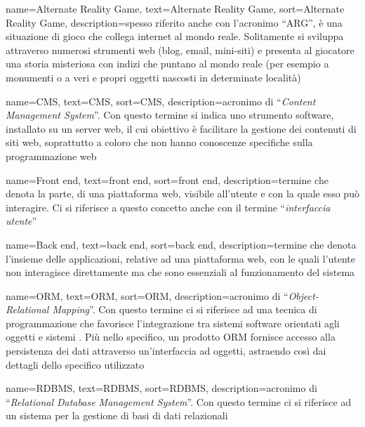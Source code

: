 {
    name=Alternate Reality Game, %
    text=Alternate Reality Game, %
    sort=Alternate Reality Game,
    description={spesso riferito anche con l’acronimo “ARG”, è una situazione di gioco che collega internet al mondo reale. Solitamente si sviluppa attraverso numerosi strumenti web (blog, email, mini-siti) e presenta al giocatore una storia misteriosa con indizi che puntano al mondo reale (per esempio a monumenti o a veri e propri oggetti nascosti in determinate località)}
}

{
    name=CMS, %
    text=CMS, %
    sort=CMS,
    description={acronimo di “\emph{Content Management System}”. Con questo termine si indica uno strumento software, installato su un server web, il cui obiettivo è facilitare la gestione dei contenuti di siti web, soprattutto a coloro che non hanno conoscenze specifiche sulla programmazione web}
}

{
    name=Front end, %
    text=front end, %
    sort=front end,
    description={termine che denota la parte, di una piattaforma web, visibile all'utente e con la quale esso può interagire. Ci si riferisce a questo concetto anche con il termine “\emph{interfaccia utente}”}
}

{
    name=Back end, %
    text=back end, %
    sort=back end,
    description={termine che denota l'insieme delle applicazioni, relative ad una piattaforma web, con le quali l'utente non interagisce direttamente ma che sono essenziali al funzionamento del sistema}
}

{
    name=ORM, %
    text=ORM, %
    sort=ORM,
    description={acronimo di “\emph{Object-Relational Mapping}”. Con questo termine ci si riferisce ad una tecnica di programmazione che favorisce l'integrazione tra sistemi software orientati agli oggetti e sistemi . Più nello specifico, un prodotto ORM fornisce accesso alla persistenza dei dati attraverso un'interfaccia ad oggetti, astraendo così dai dettagli dello specifico  utilizzato}
}

{
    name=RDBMS, %
    text=RDBMS, %
    sort=RDBMS,
    description={acronimo di “\emph{Relational Database Management System}”. Con questo termine ci si riferisce ad un sistema per la gestione di basi di dati relazionali}
}

